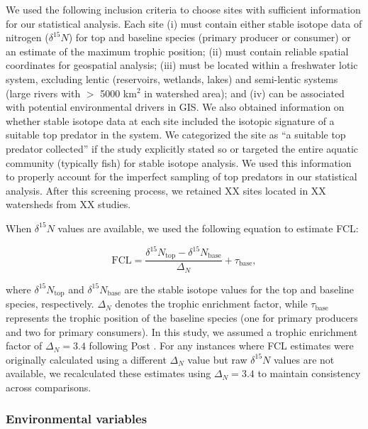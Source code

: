 \documentclass[11pt, class=article, crop=false]{standalone}
\begin{document}
We used the following inclusion criteria to choose sites with sufficient information for our statistical analysis.
Each site (i) must contain either stable isotope data of nitrogen ($\delta^{15}N$) for top and baseline species (primary producer or consumer) or an estimate of the maximum trophic position; 
(ii) must contain reliable spatial coordinates for geospatial analysis; 
(iii) must be located within a freshwater lotic system, excluding lentic (reservoirs, wetlands, lakes) and semi-lentic systems (large rivers with $>$ 5000 km$^2$ in watershed area); and (iv) can be associated with potential environmental drivers in GIS.
We also obtained information on whether stable isotope data at each site included the isotopic signature of a suitable top predator in the system.
We categorized the site as ``a suitable top predator collected'' if the study explicitly stated so or targeted the entire aquatic community (typically fish) for stable isotope analysis.
We used this information to properly account for the imperfect sampling of top predators in our statistical analysis.
After this screening process, we retained XX sites located in XX watersheds from XX studies. 

When $\delta^{15}N$ values are available, we used the following equation to estimate FCL:

\begin{equation}
    \mbox{FCL} = \frac{\delta^{15}N_{\text{top}} - \delta^{15}N_{\text{base}}}{\Delta_N} + \tau_{\text{base}},
    \label{eq:fcl-si}
\end{equation}

where $\delta^{15}N_{\text{top}}$ and $\delta^{15}N_{\text{base}}$ are the stable isotope values for the top and baseline species, respectively.
$\Delta_{N}$ denotes the trophic enrichment factor, while $\tau_{\text{base}}$ represents the trophic position of the baseline species (one for primary producers and two for primary consumers). 
In this study, we assumed a trophic enrichment factor of $\Delta_{N} = 3.4$ following Post \citep{post_using_2002}.
For any instances where FCL estimates were originally calculated using a different $\Delta_{N}$ value but raw $\delta^{15}N$ values are not available, we recalculated these estimates using $\Delta_{N} = 3.4$ to maintain consistency across comparisons.

\subsubsection{Environmental variables}
\end{document}
